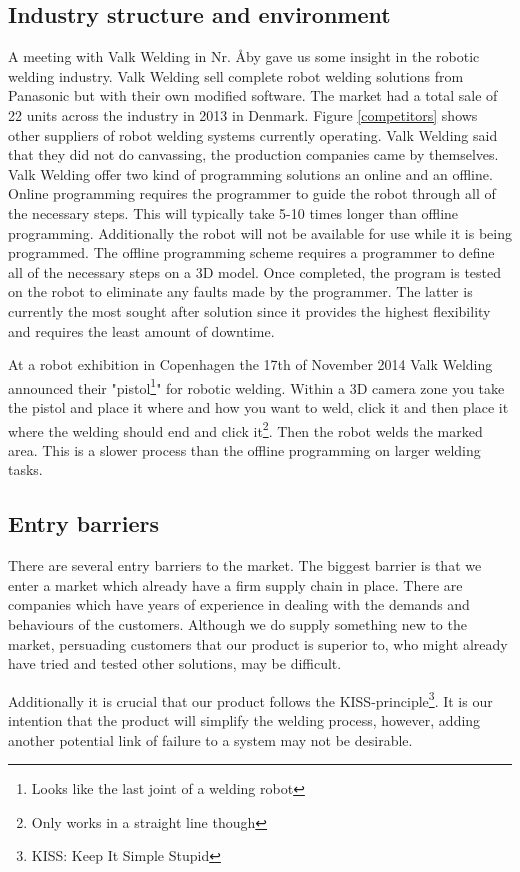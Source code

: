 \subsection{Industry structure and environment}
\label{ind.struc}
A meeting with Valk Welding in Nr. Åby\cite{valk_welding_summary} gave us some insight in the robotic welding industry. Valk Welding sell complete robot welding solutions from Panasonic but with their own modified software. The market had a total sale of 22 units across the industry in 2013 in Denmark. Figure \ref{competitors} shows other suppliers of robot welding systems currently operating. Valk Welding said that they did not do canvassing, the production companies came by themselves. Valk Welding offer two kind of programming solutions an online and an offline. 
Online programming requires the programmer to guide the robot through all of the necessary steps. This will typically take 5-10 times longer than offline programming. Additionally the robot will not be available for use while it is being programmed. The offline programming scheme requires a programmer to define all of the necessary steps on a 3D model. Once completed, the program is tested on the robot to eliminate any faults made by the programmer. The latter is currently the most sought after solution since it provides the highest flexibility and requires the least amount of downtime.

At a robot exhibition in Copenhagen the 17th of November 2014 Valk Welding announced their "pistol\footnote{Looks like the last joint of a welding robot}" for robotic welding. Within a 3D camera zone you take the pistol and place it where and how you want to weld, click it and then place it where the welding should end and click it\footnote{Only works in a straight line though}. Then the robot welds the marked area. This is a slower process than the offline programming on larger welding tasks.
\subsection{Entry barriers}
There are several entry barriers to the market. The biggest barrier is that we enter a market which already have a firm supply chain in place. There are companies which have years of experience in dealing with the demands and behaviours of the customers. Although we do supply something new to the market, persuading customers that our product is superior to, who might already have tried and tested other solutions, may be difficult.

Additionally it is crucial that our product follows the KISS-principle\footnote{KISS: Keep It Simple Stupid}. It is our intention that the product will simplify the welding process, however, adding another potential link of failure to a system may not be desirable.

